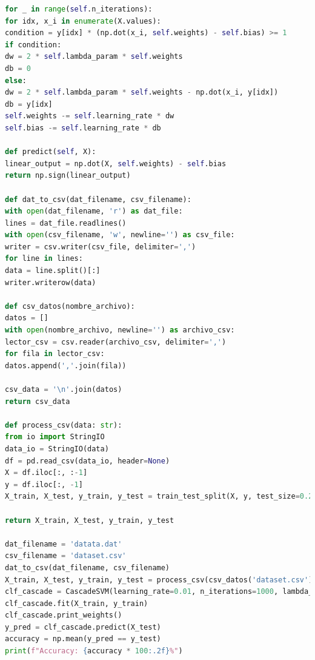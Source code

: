 \documentclass[12pt]{article}
\begin{document}
\begin{lstlisting}[language=Python]
for _ in range(self.n_iterations):
for idx, x_i in enumerate(X.values):
condition = y[idx] * (np.dot(x_i, self.weights) - self.bias) >= 1
if condition:
dw = 2 * self.lambda_param * self.weights
db = 0
else:
dw = 2 * self.lambda_param * self.weights - np.dot(x_i, y[idx])
db = y[idx]
self.weights -= self.learning_rate * dw
self.bias -= self.learning_rate * db

def predict(self, X):
linear_output = np.dot(X, self.weights) - self.bias
return np.sign(linear_output)

def dat_to_csv(dat_filename, csv_filename):
with open(dat_filename, 'r') as dat_file:
lines = dat_file.readlines()
with open(csv_filename, 'w', newline='') as csv_file:
writer = csv.writer(csv_file, delimiter=',')
for line in lines:
data = line.split()[:]
writer.writerow(data)

def csv_datos(nombre_archivo):
datos = []
with open(nombre_archivo, newline='') as archivo_csv:
lector_csv = csv.reader(archivo_csv, delimiter=',')
for fila in lector_csv:
datos.append(','.join(fila))

csv_data = '\n'.join(datos)
return csv_data

def process_csv(data: str):
from io import StringIO
data_io = StringIO(data)
df = pd.read_csv(data_io, header=None)
X = df.iloc[:, :-1]
y = df.iloc[:, -1]
X_train, X_test, y_train, y_test = train_test_split(X, y, test_size=0.2, random_state=42)

return X_train, X_test, y_train, y_test

dat_filename = 'datata.dat'
csv_filename = 'dataset.csv'
dat_to_csv(dat_filename, csv_filename)
X_train, X_test, y_train, y_test = process_csv(csv_datos('dataset.csv'))
clf_cascade = CascadeSVM(learning_rate=0.01, n_iterations=1000, lambda_param=0.1)
clf_cascade.fit(X_train, y_train)
clf_cascade.print_weights()
y_pred = clf_cascade.predict(X_test)
accuracy = np.mean(y_pred == y_test)
print(f"Accuracy: {accuracy * 100:.2f}%")


\end{lstlisting}

\clearpage
\end{document}
